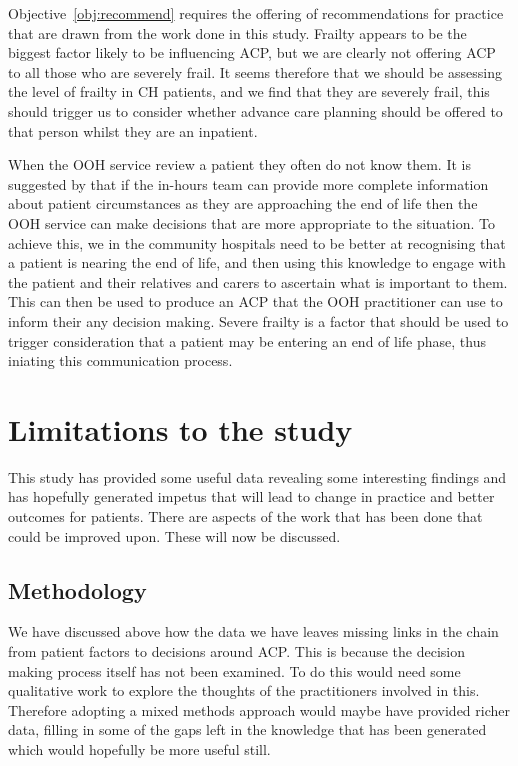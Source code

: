 \documentclass
[
	12pt,
	a4paper,
	oneside,
]{report}
\begin{document}
Objective~\ref{obj:recommend} requires the offering of recommendations for 
practice that are drawn from the work done in this study. Frailty appears
to be the biggest factor likely to be influencing ACP, but we are clearly
not offering ACP to all those who are severely frail. It seems therefore that
we should be assessing the level of frailty in CH patients, and we find that 
they are severely frail, this should trigger us to consider whether advance 
care planning should be offered to that person whilst they are an inpatient.

When the OOH service review a patient they often do not know them. It is 
suggested by \textcite{brettell:18} that if the in-hours team can provide more
complete information about patient circumstances as they are approaching the
end of life then the OOH service can make decisions that are more appropriate
to the situation. To achieve this, we in the community hospitals need to be 
better at recognising that a patient is nearing the end of life, and then 
using this knowledge to engage with the patient and their relatives and 
carers to ascertain what is important to them. This can then be used to 
produce an ACP that the OOH practitioner can use to inform their any decision
making. Severe frailty is a factor that should be used to trigger consideration
that a patient may be entering an end of life phase, thus iniating this
communication process.
\section{Limitations to the study}

This study has provided some useful data revealing some interesting findings
and has hopefully generated impetus that will lead to change in practice and
better outcomes for patients. There are aspects of the work that has been done
that could be improved upon. These will now be discussed.

\subsection{Methodology}

We have discussed above how the data we have leaves missing links in the 
chain from patient factors to decisions around ACP. This is because the
decision making process itself has not been examined. To do this would need 
some qualitative work to explore the thoughts of the practitioners involved
in this. Therefore adopting a mixed methods approach 
would maybe have provided richer data, filling in some of the gaps left in the
knowledge that has been generated which would hopefully be more useful still.
\end{document}
